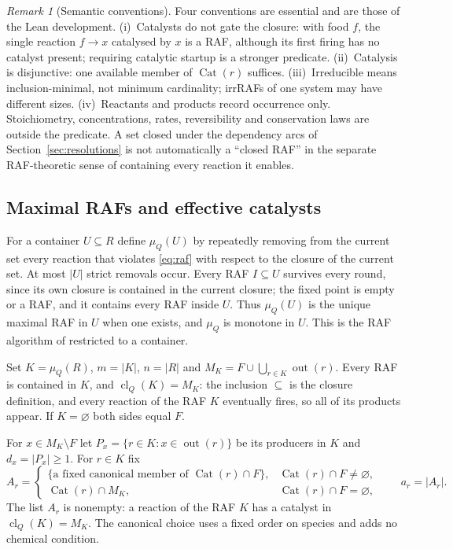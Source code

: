 \documentclass[11pt,a4paper]{article}
\theoremstyle{plain}
\theoremstyle{definition}
\theoremstyle{remark}
\newtheorem{remark}[theorem]{Remark}
\newcommand{\cl}{\operatorname{cl}}
\newcommand{\muQ}{\mu_Q}
\newcommand{\Cat}{\operatorname{Cat}}
\newcommand{\out}{\operatorname{out}}
\begin{document}
\begin{remark}[Semantic conventions]\label{rem:semantics}
Four conventions are essential and are those of the Lean development. (i)~Catalysts do not gate the closure: with food $f$, the single reaction $f\to x$ catalysed by $x$ is a RAF, although its first firing has no catalyst present; requiring catalytic startup is a stronger predicate. (ii)~Catalysis is disjunctive: one available member of $\Cat(r)$ suffices. (iii)~Irreducible means inclusion-minimal, not minimum cardinality; irrRAFs of one system may have different sizes. (iv)~Reactants and products record occurrence only. Stoichiometry, concentrations, rates, reversibility and conservation laws are outside the predicate. A set closed under the dependency arcs of Section~\ref{sec:resolutions} is not automatically a ``closed RAF'' in the separate RAF-theoretic sense of containing every reaction it enables.
\end{remark}

\subsection{Maximal RAFs and effective catalysts}\label{sec:maxraf}

For a container $U\subseteq R$ define $\muQ(U)$ by repeatedly removing from the current set every reaction that violates \eqref{eq:raf} with respect to the closure of the current set. At most $|U|$ strict removals occur. Every RAF $I\subseteq U$ survives every round, since its own closure is contained in the current closure; the fixed point is empty or a RAF, and it contains every RAF inside $U$. Thus $\muQ(U)$ is the unique maximal RAF in $U$ when one exists, and $\muQ$ is monotone in $U$. This is the RAF algorithm of \cite{hordijk2004detecting} restricted to a container.

Set $K=\muQ(R)$, $m=|K|$, $n=|R|$ and $M_K=F\cup\bigcup_{r\in K}\out(r)$. Every RAF is contained in $K$, and $\cl_Q(K)=M_K$: the inclusion $\subseteq$ is the closure definition, and every reaction of the RAF $K$ eventually fires, so all of its products appear. If $K=\varnothing$ both sides equal $F$.

For $x\in M_K\setminus F$ let $P_x=\{r\in K:x\in\out(r)\}$ be its producers in $K$ and $d_x=|P_x|\ge1$. For $r\in K$ fix
\begin{equation}\label{eq:effective}
 A_r=\begin{cases}
 \{\text{a fixed canonical member of }\Cat(r)\cap F\},&\Cat(r)\cap F\neq\varnothing,\\
 \Cat(r)\cap M_K,&\Cat(r)\cap F=\varnothing,
 \end{cases}\qquad a_r=|A_r|.
\end{equation}
The list $A_r$ is nonempty: a reaction of the RAF $K$ has a catalyst in $\cl_Q(K)=M_K$. The canonical choice uses a fixed order on species and adds no chemical condition.
\end{document}
